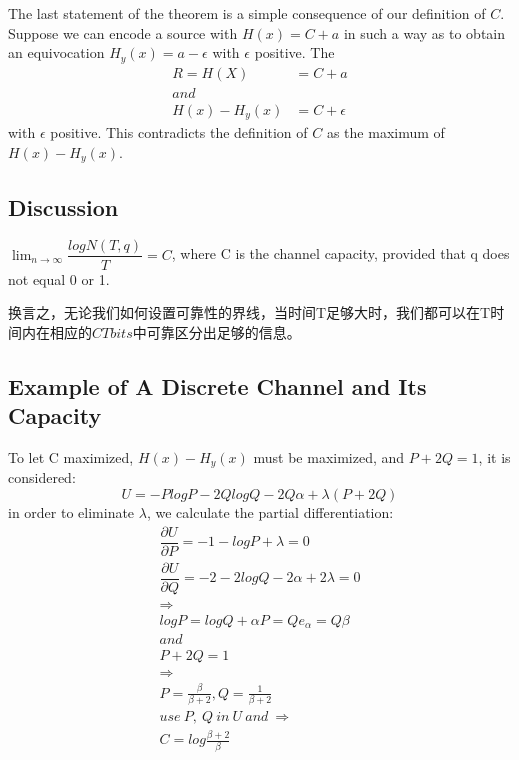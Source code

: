 \documentclass[conference]{IEEEtran}
\begin{document}
The last statement of the theorem is a simple consequence of our definition of $C$. Suppose we can encode a source with $H(x)=C+a$ in such a way as to obtain an equivocation $H_y(x)=a-\epsilon$ with $\epsilon$ positive. The 
\begin{align*}
R=H(X)		&=C+a		\\
and						\\
H(x)-H_y(x)	&=C+\epsilon
\end{align*}
with $\epsilon$ positive. This contradicts the definition of $C$ as the maximum of $H(x)-H_y(x)$.

\subsection{Discussion}
\begin{theorem}
	$ \lim_{n\to\infty}\dfrac{logN(T,q)}{T}=C$, where C is the channel capacity, provided that q does not equal 0 or 1.
\end{theorem}

换言之，无论我们如何设置可靠性的界线，当时间T足够大时，我们都可以在T时间内在相应的$CT bits$中可靠区分出足够的信息。

\subsection{Example of A Discrete Channel and Its Capacity}
To let C maximized, $H(x)-H_y(x)$ must be maximized, and $P+2Q=1$, it is considered:
\begin{equation*}
U = -PlogP-2QlogQ-2Q\alpha+\lambda(P+2Q)
\end{equation*}
in order to eliminate $\lambda$, we calculate the partial differentiation:
\begin{equation*}
\begin{gathered}
\dfrac{\partial U}{\partial P}=-1-logP+\lambda=0 \\
\dfrac{\partial U}{\partial Q}=-2-2logQ-2\alpha+2\lambda=0 \\
\Longrightarrow \\
logP=logQ+\alpha
P=Qe_{\alpha}=Q\beta \\
and \\
P+2Q=1 \\
\Longrightarrow \\
P=\frac{\beta}{\beta+2},Q=\frac{1}{\beta+2}\\
use\ P,\ Q\ in\ U\ and\ \Longrightarrow\\
C=log\frac{\beta+2}{\beta}
\end{gathered}
\end{equation*}
\end{document}
